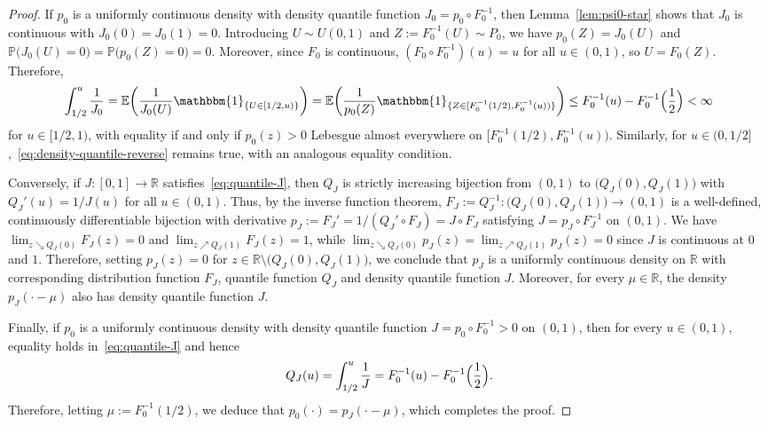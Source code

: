 \documentclass[a4paper]{article}
\newcommand{\R}{\mathbb{R}}
\newcommand{\E}{\mathbb{E}}
\renewcommand{\Pr}{\mathbb{P}}
\newcommand{\Ind}{\mathbbm{1}}
\theoremstyle{definition}
\begin{document}
\begin{proof}
If $p_0$ is a uniformly continuous density with density quantile function $J_0 = p_0 \circ F_0^{-1}$, then Lemma~\ref{lem:psi0-star} shows that $J_0$ is continuous with $J_0(0) = J_0(1) = 0$. Introducing $U \sim U(0,1)$ and $Z := F_0^{-1}(U) \sim P_0$, we have $p_0(Z) = J_0(U)$ and $\Pr\bigl(J_0(U) = 0\bigr) = \Pr\bigl(p_0(Z) = 0\bigr) = 0$. Moreover, since $F_0$ is continuous, $(F_0 \circ F_0^{-1})(u) = u$ for all $u \in (0,1)$, so $U = F_0(Z)$. Therefore,
\begin{equation}
\label{eq:density-quantile-reverse}
\int_{1/2}^u \frac{1}{J_0} = \E\biggl(\frac{1}{J_0(U)} \Ind_{\{U \in [1/2,u)\}}\biggr) = \E\biggl(\frac{1}{p_0(Z)} \Ind_{\{Z \in [F_0^{-1}(1/2),F_0^{-1}(u))\}}\biggr) \leq F_0^{-1}(u) - F_0^{-1}\Bigl(\frac{1}{2}\Bigr) < \infty
\end{equation}
for $u \in [1/2,1)$, with equality if and only if $p_0(z) > 0$ Lebesgue almost everywhere on $\bigl[F_0^{-1}(1/2),F_0^{-1}(u)\bigr)$. Similarly, for $u \in (0,1/2]$,~\eqref{eq:density-quantile-reverse} remains true, with an analogous equality condition.

Conversely, if $J \colon [0,1] \to \R$ satisfies~\eqref{eq:quantile-J}, then $Q_J$ is strictly increasing bijection from $(0,1)$ to $\bigl(Q_J(0),Q_J(1)\bigr)$ with $Q_J'(u) = 1/J(u)$ for all $u \in (0,1)$. Thus, by the inverse function theorem, $F_J := Q_J^{-1} \colon \bigl(Q_J(0),Q_J(1)\bigr) \to (0,1)$ is a well-defined, continuously differentiable bijection with derivative $p_J := F_J' = 1/(Q_J' \circ F_J) = J \circ F_J$ satisfying $J = p_J \circ F_J^{-1}$ on $(0,1)$. We have $\lim_{z \searrow Q_J(0)}F_J(z) = 0$ and $\lim_{z \nearrow Q_J(1)}F_J(z) = 1$, while $\lim_{z \searrow Q_J(0)}p_J(z) = \lim_{z \nearrow Q_J(1)}p_J(z) = 0$ since $J$ is continuous at $0$ and $1$. Therefore, setting $p_J(z) = 0$ for $z \in \R \setminus \bigl(Q_J(0),Q_J(1)\bigr)$, we conclude that $p_J$ is a uniformly continuous density on $\R$ with corresponding distribution function $F_J$, quantile function $Q_J$ and density quantile function $J$. Moreover, for every $\mu \in \R$, the density $p_J(\cdot - \mu)$ also has density quantile function $J$.

Finally, if $p_0$ is a uniformly continuous density with density quantile function $J = p_0 \circ F_0^{-1} > 0$ on $(0,1)$, then for every $u \in (0,1)$, equality holds in~\eqref{eq:quantile-J} and hence
\[
Q_J(u) = \int_{1/2}^u \frac{1}{J} = F_0^{-1}(u) - F_0^{-1}\Bigl(\frac{1}{2}\Bigr).
\]
Therefore, letting $\mu := F_0^{-1}(1/2)$, we deduce that $p_0(\cdot) = p_J(\cdot - \mu)$, which completes the proof.
\end{proof}
\end{document}
